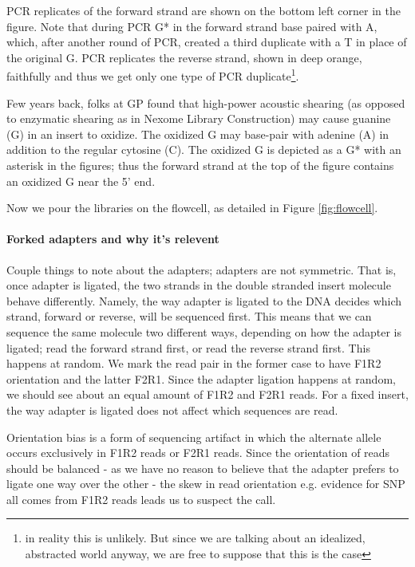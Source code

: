 \documentclass[a4paper]{article}
\begin{document}
PCR replicates of the forward strand are shown on the bottom left corner in the figure. Note that during PCR G* in the forward strand base paired with A, which, after another round of PCR, created a third duplicate with a T in place of the original G. PCR replicates the reverse strand, shown in deep orange, faithfully and thus we get only one type of PCR duplicate\footnote{in reality this is unlikely. But since we are talking about an idealized, abstracted world anyway, we are free to suppose that this is the case}. 

Few years back, folks at GP found that high-power acoustic shearing (as opposed to enzymatic shearing as in Nexome Library Construction) may cause guanine (G) in an insert to oxidize. The oxidized G may base-pair with adenine (A) in addition to the regular cytosine (C). The oxidized G is depicted as a G* with an asterisk in the figures; thus the forward strand at the top of the figure contains an oxidized G near the 5' end.

Now we pour the libraries on the flowcell, as detailed in Figure \ref{fig:flowcell}. 

\paragraph{Forked adapters and why it's relevent}

 
Couple things to note about the adapters; adapters are not symmetric. That is, once adapter is ligated, the two strands in the double stranded insert molecule behave differently. Namely, the way adapter is ligated to the DNA decides which strand, forward or reverse, will be sequenced first. This means that we can sequence the same molecule two different ways, depending on how the adapter is ligated; read the forward strand first, or read the reverse strand first. This happens at random. We mark the read pair in the former case to have F1R2 orientation and the latter F2R1. Since the adapter ligation happens at random, we should see about an equal amount of F1R2 and F2R1 reads. For a fixed insert, the way adapter is ligated does not affect which sequences are read. 

Orientation bias is a form of sequencing artifact in which the alternate allele occurs exclusively in F1R2 reads or F2R1 reads. Since the orientation of reads should be balanced - as we have no reason to believe that the adapter prefers to ligate one way over the other - the skew in read orientation e.g. evidence for SNP all comes from F1R2 reads leads us to suspect the call.
\end{document}
